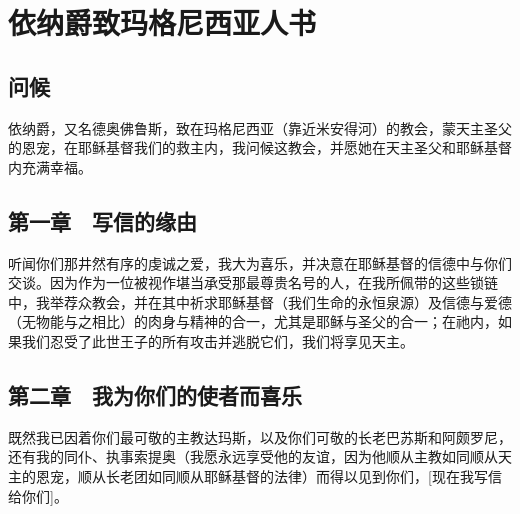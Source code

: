 
\chapter{依纳爵致玛格尼西亚人书}



\section{问候}

依纳爵，又名德奥佛鲁斯，致在玛格尼西亚（靠近米安得河）的教会，蒙天主圣父的恩宠，在耶稣基督我们的救主内，我问候这教会，并愿她在天主圣父和耶稣基督内充满幸福。\par


\section{第一章　写信的缘由}

听闻你们那井然有序的虔诚之爱，我大为喜乐，并决意在耶稣基督的信德中与你们交谈。因为作为一位被视作堪当承受那最尊贵名号的人，在我所佩带的这些锁链中，我举荐众教会，并在其中祈求耶稣基督（我们生命的永恒泉源）及信德与爱德（无物能与之相比）的肉身与精神的合一，尤其是耶稣与圣父的合一；在祂内，如果我们忍受了此世王子的所有攻击并逃脱它们，我们将享见天主。\par


\section{第二章　我为你们的使者而喜乐}

既然我已因着你们最可敬的主教达玛斯，以及你们可敬的长老巴苏斯和阿颇罗尼，还有我的同仆、执事索提奥（我愿永远享受他的友谊，因为他顺从主教如同顺从天主的恩宠，顺从长老团如同顺从耶稣基督的法律）而得以见到你们，[现在我写信给你们]。\par


